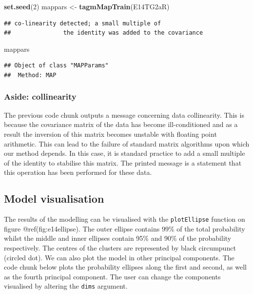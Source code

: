\documentclass[
]{article}
\newenvironment{Shaded}{\begin{snugshade}}{\end{snugshade}}
\newcommand{\DecValTok}[1]{\textcolor[rgb]{0.00,0.00,0.81}{#1}}
\newcommand{\KeywordTok}[1]{\textcolor[rgb]{0.13,0.29,0.53}{\textbf{#1}}}
\newcommand{\NormalTok}[1]{#1}
\newcommand{\StringTok}[1]{\textcolor[rgb]{0.31,0.60,0.02}{#1}}
\begin{document}
\begin{Shaded}
\begin{Highlighting}[]
\KeywordTok{set.seed}\NormalTok{(}\DecValTok{2}\NormalTok{)}
\NormalTok{mappars <-}\StringTok{ }\KeywordTok{tagmMapTrain}\NormalTok{(E14TG2aR)}
\end{Highlighting}
\end{Shaded}

\begin{verbatim}
## co-linearity detected; a small multiple of
##               the identity was added to the covariance
\end{verbatim}

\begin{Shaded}
\begin{Highlighting}[]
\NormalTok{mappars}
\end{Highlighting}
\end{Shaded}

\begin{verbatim}
## Object of class "MAPParams"
##  Method: MAP
\end{verbatim}

\hypertarget{aside-collinearity}{%
\subsubsection*{Aside: collinearity}\label{aside-collinearity}}

The previous code chunk outputs a message concerning data collinearity.
This is because the covariance matrix of the data has become
ill-conditioned and as a result the inversion of this matrix becomes
unstable with floating point arithmetic. This can lead to the failure of
standard matrix algorithms upon which our method depends. In this case,
it is standard practice to add a small multiple of the identity to
stabilise this matrix. The printed message is a statement that this
operation has been performed for these data.

\hypertarget{model-visualisation}{%
\subsection{Model visualisation}\label{model-visualisation}}

The results of the modelling can be visualised with the
\texttt{plotEllipse} function on figure @ref(fig:e14ellipse). The outer
ellipse contains 99\% of the total probability whilst the middle and
inner ellipses contain 95\% and 90\% of the probability respectively.
The centres of the clusters are represented by black circumpunct
(circled dot). We can also plot the model in other principal components.
The code chunk below plots the probability ellipses along the first and
second, as well as the fourth principal component. The user can change
the components visualised by altering the \texttt{dims} argument.
\end{document}
